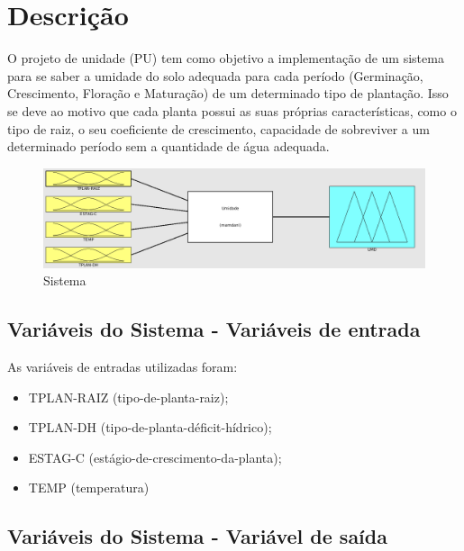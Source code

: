 \section{Descrição}

O projeto de unidade (PU) tem como objetivo a implementação de um sistema \fuzzy para se saber a umidade do solo adequada para cada período (Germinação, Crescimento, Floração e Maturação) de um  determinado tipo de plantação. Isso se deve ao motivo que cada planta possui as suas próprias características, como o tipo de raiz, o seu coeficiente de crescimento, capacidade de sobreviver a um determinado período sem a quantidade de água adequada.    


\begin{figure}[h!]
\centering
\includegraphics[width=1\linewidth]{Descricao/Imagens/Sistema}
\caption{Sistema \fuzzy}
\label{fig:Sistema}
\end{figure}


\subsection{Variáveis do Sistema - Variáveis de entrada}

As variáveis de entradas utilizadas foram: 

\begin{itemize}
	\item TPLAN-RAIZ (tipo-de-planta-raiz);
	\item TPLAN-DH (tipo-de-planta-déficit-hídrico);
	\item ESTAG-C (estágio-de-crescimento-da-planta);
	\item TEMP (temperatura)
\end{itemize}

\newpage

\newpage

\newpage




\subsection{Variáveis do Sistema - Variável de saída}




